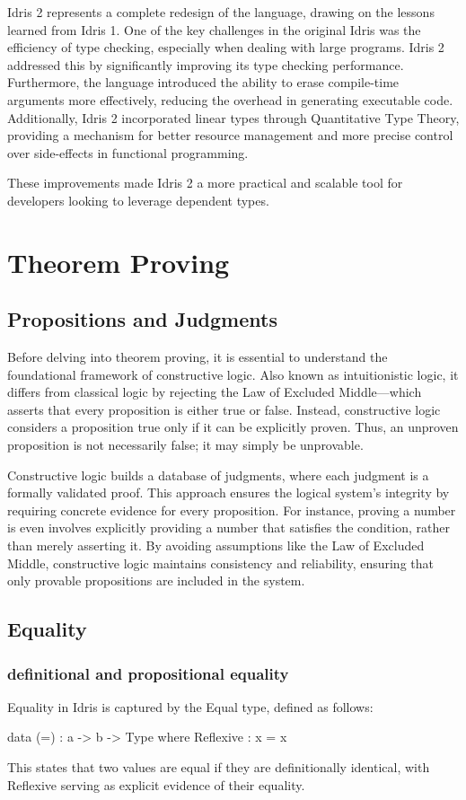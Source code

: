 \documentclass[]{rptuseminar}
\begin{document}
Idris 2 represents a complete redesign of the language, drawing on the lessons learned from Idris 1. One of the key challenges in the original Idris was the efficiency of type checking, especially when dealing with large programs. Idris 2 addressed this by significantly improving its type checking performance. Furthermore, the language introduced the ability to erase compile-time arguments more effectively, reducing the overhead in generating executable code. Additionally, Idris 2 incorporated linear types through Quantitative Type Theory, providing a mechanism for better resource management and more precise control over side-effects in functional programming.

These improvements made Idris 2 a more practical and scalable tool for developers looking to leverage dependent types.
  

\section{Theorem Proving}
\label{sec:Propositions and judgments}
\subsection{Propositions and Judgments}
Before delving into theorem proving, it is essential to understand the foundational framework of constructive logic. Also known as intuitionistic logic, it differs from classical logic by rejecting the Law of Excluded Middle—which asserts that every proposition is either true or false. Instead, constructive logic considers a proposition true only if it can be explicitly proven. Thus, an unproven proposition is not necessarily false; it may simply be unprovable.

Constructive logic builds a database of judgments, where each judgment is a formally validated proof. This approach ensures the logical system’s integrity by requiring concrete evidence for every proposition. For instance, proving a number is even involves explicitly providing a number that satisfies the condition, rather than merely asserting it. By avoiding assumptions like the Law of Excluded Middle, constructive logic maintains consistency and reliability, ensuring that only provable propositions are included in the system.
\subsection{Equality}
\label{sec:Equality}
\subsubsection{definitional and propositional equality}
Equality in Idris is captured by the Equal type, defined as follows:
\begin{idris}
data (=) : a -> b -> Type where  
    Reflexive : x = x
\end{idris}
This states that two values are equal if they are definitionally identical, with Reflexive serving as explicit evidence of their equality.
\end{document}
